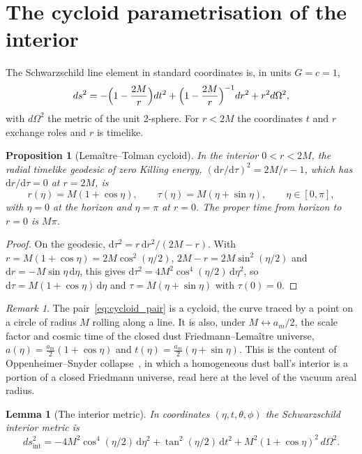 \documentclass{iopjournal}
\theoremstyle{plain}
\newtheorem{proposition}[theorem]{Proposition}
\newtheorem{lemma}[theorem]{Lemma}
\theoremstyle{remark}
\newtheorem{remark}[theorem]{Remark}
\newcommand{\dd}{\mathrm{d}}
\begin{document}
\section{The cycloid parametrisation of the interior}\label{sec:cycloid}

The Schwarzschild line element in standard coordinates is, in units $G=c=1$,
\begin{equation}
ds^{2}=-\Bigl(1-\frac{2M}{r}\Bigr)dt^{2}+\Bigl(1-\frac{2M}{r}\Bigr)^{-1}dr^{2}+r^{2}d\Omega^{2},
\end{equation}
with $d\Omega^{2}$ the metric of the unit 2-sphere. For $r<2M$ the coordinates $t$ and $r$ exchange roles and $r$ is timelike.

\begin{proposition}[Lemaître--Tolman cycloid]\label{prop:cycloid}
In the interior $0<r<2M$, the radial timelike geodesic of zero Killing energy, $(\dd r/\dd\tau)^{2}=2M/r-1$, which has $\dd r/\dd\tau=0$ at $r=2M$, is
\begin{equation}\label{eq:cycloid_pair}
r(\eta)=M(1+\cos\eta),\qquad \tau(\eta)=M(\eta+\sin\eta),\qquad \eta\in[0,\pi],
\end{equation}
with $\eta=0$ at the horizon and $\eta=\pi$ at $r=0$. The proper time from horizon to $r=0$ is $M\pi$.
\end{proposition}

\begin{proof}
On the geodesic, $\dd\tau^{2}=r\,\dd r^{2}/(2M-r)$. With $r=M(1+\cos\eta)=2M\cos^{2}(\eta/2)$, $2M-r=2M\sin^{2}(\eta/2)$ and $\dd r=-M\sin\eta\,\dd\eta$, this gives $\dd\tau^{2}=4M^{2}\cos^{4}(\eta/2)\,\dd\eta^{2}$, so $\dd\tau=M(1+\cos\eta)\,\dd\eta$ and $\tau=M(\eta+\sin\eta)$ with $\tau(0)=0$.
\end{proof}

\begin{remark}
The pair~\eqref{eq:cycloid_pair} is a cycloid, the curve traced by a point on a circle of radius $M$ rolling along a line. It is also, under $M\leftrightarrow a_{m}/2$, the scale factor and cosmic time of the closed dust Friedmann--Lemaître universe, $a(\eta)=\tfrac{a_{m}}{2}(1+\cos\eta)$ and $t(\eta)=\tfrac{a_{m}}{2}(\eta+\sin\eta)$. This is the content of Oppenheimer--Snyder collapse~\cite{Oppenheimer1939b}, in which a homogeneous dust ball's interior is a portion of a closed Friedmann universe, read here at the level of the vacuum areal radius.
\end{remark}

\begin{lemma}[The interior metric]\label{lem:interior_metric}
In coordinates $(\eta,t,\theta,\phi)$ the Schwarzschild interior metric is
\begin{equation}\label{eq:interior_metric}
ds^{2}_{\mathrm{int}}=-4M^{2}\cos^{4}(\eta/2)\,\dd\eta^{2}+\tan^{2}(\eta/2)\,\dd t^{2}+M^{2}(1+\cos\eta)^{2}\,d\Omega^{2}.
\end{equation}
\end{lemma}
\end{document}
